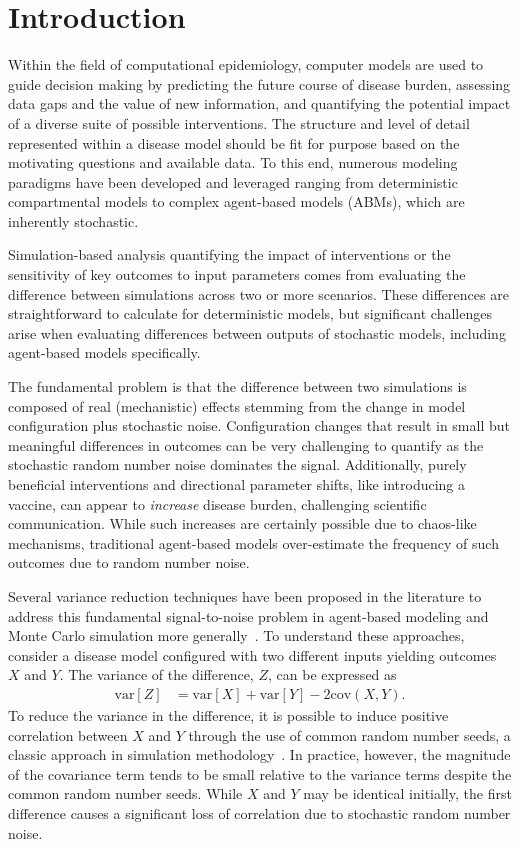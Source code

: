 \documentclass[10pt,letterpaper]{article}
\begin{document}
\linenumbers

\section*{Introduction}\label{s:intro}

Within the field of computational epidemiology, computer models are used to guide decision making by predicting the future course of disease burden, assessing data gaps and the value of new information, and quantifying the potential impact of a diverse suite of possible interventions. The structure and level of detail represented within a disease model should be fit for purpose based on the motivating questions and available data. To this end, numerous modeling paradigms have been developed and leveraged ranging from deterministic compartmental models to complex agent-based models (ABMs), which are inherently stochastic.

Simulation-based analysis quantifying the impact of interventions or the sensitivity of key outcomes to input parameters comes from evaluating the difference between simulations across two or more scenarios. These differences are straightforward to calculate for deterministic models, but significant challenges arise when evaluating differences between outputs of stochastic models, including agent-based models specifically.

The fundamental problem is that the difference between two simulations is composed of real (mechanistic) effects stemming from the change in model configuration plus stochastic noise. Configuration changes that result in small but meaningful differences in outcomes can be very challenging to quantify as the stochastic random number noise dominates the signal. Additionally, purely beneficial interventions and directional parameter shifts, like introducing a vaccine, can appear to \textit{increase} disease burden, challenging scientific communication. While such increases are certainly possible due to chaos-like mechanisms, traditional agent-based models over-estimate the frequency of such outcomes due to random number noise.

Several variance reduction techniques have been proposed in the literature to address this fundamental signal-to-noise problem in agent-based modeling and Monte Carlo simulation more generally~\cite{botev_variance_2017}. To understand these approaches, consider a disease model configured with two different inputs yielding outcomes $X$ and $Y$. The variance of the difference, $Z$, can be expressed as
\begin{align}
    \text{var}[Z] &= \text{var}[X] + \text{var}[Y] - 2\text{cov}(X,Y).
\label{eq:var}
\end{align}
To reduce the variance in the difference, it is possible to induce positive correlation between $X$ and $Y$ through the use of common random number seeds, a classic approach in simulation methodology~\cite{kahn_methods_1953}. In practice, however, the magnitude of the covariance term tends to be small relative to the variance terms despite the common random number seeds. While $X$ and $Y$ may be identical initially, the first difference causes a significant loss of correlation due to stochastic random number noise.
\end{document}

